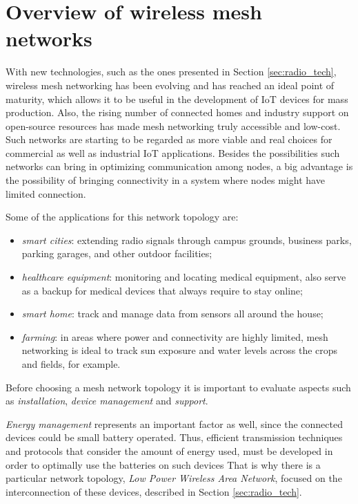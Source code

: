 	\section{Overview of wireless mesh networks}
		
		With new technologies, such as the ones presented in Section \ref{sec:radio_tech}, wireless mesh networking has been evolving and has reached an ideal point of maturity, which allows it to be useful in the development of IoT devices for mass production.
		Also, the rising number of connected homes and industry support on open-source resources has made mesh networking truly accessible and low-cost.
		Such networks are starting to be regarded as more viable and real choices for commercial as well as industrial IoT applications.
		Besides the possibilities such networks can bring in optimizing communication among nodes, a big advantage is the possibility of bringing connectivity in a system where nodes might have limited connection.
		
		Some of the applications for this network topology are:
		\begin{itemize}
			\item \textit{smart cities}: extending radio signals through campus grounds, business parks, parking garages, and other outdoor facilities;
			\item \textit{healthcare equipment}: monitoring and locating medical equipment, also serve as a backup for medical devices that always require to stay online;
			\item \textit{smart home}: track and manage data from sensors all around the house;
			\item \textit{farming}: in areas where power and connectivity are highly limited, mesh networking is ideal to track sun exposure and water levels across the crops and fields, for example.
		\end{itemize}
	
		Before choosing a mesh network topology it is important to evaluate aspects such as \textit{installation}, \textit{device management} and \textit{support}.
	
		\textit{Energy management} represents an important factor as well, since the connected devices could be small battery operated.
		Thus, efficient transmission techniques and protocols that consider the amount of energy used, must be developed in order to optimally use the batteries on such devices		
		That is why there is a particular network topology, \textit{Low Power Wireless Area Network}, focused on the interconnection of these devices, described in Section \ref{sec:radio_tech}.
		
